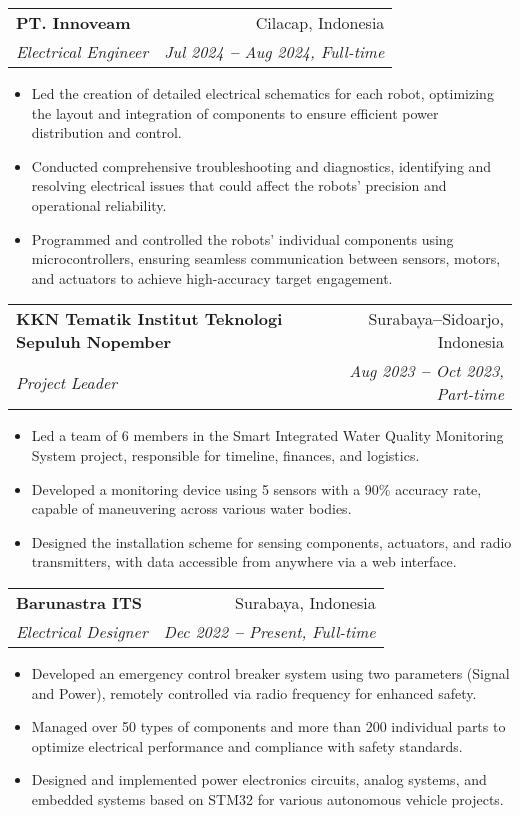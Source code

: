 \documentclass[letterpaper,11pt]{article}
\makeatletter
\newcommand{\resumeItem}[1]{
  \item\small{
    {#1 \vspace{-2pt}}
  }
}
\newcommand{\resumeSubheading}[4]{
  \vspace{-2pt}\item
    \begin{tabular*}{0.97\textwidth}[t]{l@{\extracolsep{\fill}}r}
      \textbf{#1} & #2 \\
      \textit{\small#3} & \textit{\small #4} \\
    \end{tabular*}\vspace{-7pt}
}
\newcommand{\resumeItemListStart}{\begin{itemize}}
\newcommand{\resumeItemListEnd}{\end{itemize}\vspace{-5pt}}
\makeatother
\begin{document}
    \resumeSubheading
      {PT. Innoveam}{Cilacap, Indonesia}
      {Electrical Engineer}{Jul 2024 \textbf{--} Aug 2024, Full-time}
        \resumeItemListStart
            \resumeItem{Led the creation of detailed electrical schematics for each robot, optimizing the layout and integration of components to ensure efficient power distribution and control.}
            \resumeItem{Conducted comprehensive troubleshooting and diagnostics, identifying and resolving electrical issues that could affect the robots' precision and operational reliability.}
            \resumeItem{Programmed and controlled the robots’ individual components using microcontrollers, ensuring seamless communication between sensors, motors, and actuators to achieve high-accuracy target engagement.}
    \resumeItemListEnd
    
    \resumeSubheading
      {KKN Tematik Institut Teknologi Sepuluh Nopember}{Surabaya\textbf{--}Sidoarjo, Indonesia}
      {Project Leader}{Aug 2023 \textbf{--} Oct 2023, Part-time}
        \resumeItemListStart
            \resumeItem{Led a team of 6 members in the Smart Integrated Water Quality Monitoring System project, responsible for timeline, finances, and logistics.}
            \resumeItem{Developed a monitoring device using 5 sensors with a 90\% accuracy rate, capable of maneuvering across various water bodies.}
            \resumeItem{Designed the installation scheme for sensing components, actuators, and radio transmitters, with data accessible from anywhere via a web interface.}
        \resumeItemListEnd


    \resumeSubheading
      {Barunastra ITS}{Surabaya, Indonesia}
      {Electrical Designer}{Dec 2022 \textbf{--} Present, Full-time}
        \resumeItemListStart
            \resumeItem{Developed an emergency control breaker system using two parameters (Signal and Power), remotely controlled via radio frequency for enhanced safety.}
            \resumeItem{Managed over 50 types of components and more than 200 individual parts to optimize electrical performance and compliance with safety standards.}
            \resumeItem{Designed and implemented power electronics circuits, analog systems, and embedded systems based on STM32 for various autonomous vehicle projects.}
        \resumeItemListEnd
\end{document}
